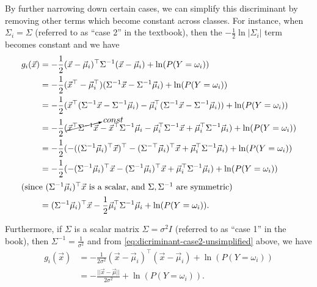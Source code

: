 \documentclass[headings=optiontoheadandtoc,listof=totoc,parskip=full]{scrartcl}
\begin{document}
By further narrowing down certain cases, we can simplify this discriminant by removing other terms which become constant across classes. For instance, when $\Sigma_i = \Sigma$ (referred to as ``case 2'' in the textbook), then the $-\frac{1}{2}\ln|\Sigma_i|$ term becomes constant and we have
\begin{align}
	g_i(\vec x) &= -\frac{1}{2}(\vec x - \vec\mu_i)^\top \Sigma^{-1} (\vec x - \vec\mu_i) + \ln(P(Y = \omega_i)) \label{eq:dicriminant-case2-unsimplified}\\
		&= -\frac{1}{2}(\vec x^\top - \vec\mu_i^\top)  (\Sigma^{-1}\vec x - \Sigma^{-1}\vec\mu_i) + \ln(P(Y = \omega_i)) \nonumber\\
		&= -\frac{1}{2}(\vec x^\top(\Sigma^{-1}\vec x - \Sigma^{-1}\vec\mu_i) - \vec\mu_i^\top(\Sigma^{-1}\vec x - \Sigma^{-1}\vec\mu_i)) + \ln(P(Y = \omega_i)) \nonumber\\
		&= -\frac{1}{2}( \cancelto{const}{\vec x^\top\Sigma^{-1}\vec x} - \vec x^\top\Sigma^{-1}\vec\mu_i - \vec\mu_i^\top\Sigma^{-1}\vec x + \vec\mu_i^\top\Sigma^{-1}\vec\mu_i) + \ln(P(Y = \omega_i)) \nonumber\\
		&= -\frac{1}{2}(-((\Sigma^{-1}\vec\mu_i)^\top\vec x)^\top - (\Sigma^{-\top}\vec\mu_i)^\top\vec x + \vec\mu_i^\top\Sigma^{-1}\vec\mu_i) + \ln(P(Y = \omega_i)) \nonumber\\
		&= -\frac{1}{2}(-(\Sigma^{-1}\vec\mu_i)^\top\vec x - (\Sigma^{-1}\vec\mu_i)^\top\vec x + \vec\mu_i^\top\Sigma^{-1}\vec\mu_i) + \ln(P(Y = \omega_i)) \nonumber\\
	\shortintertext{(since $(\Sigma^{-1}\vec\mu_i)^\top\vec x$ is a scalar, and $\Sigma, \Sigma^{-1}$ are symmetric)}
		&= (\Sigma^{-1}\vec\mu_i)^\top\vec x -\frac{1}{2}\vec\mu_i^\top\Sigma^{-1}\vec\mu_i + \ln(P(Y = \omega_i)). \label{eq:dicriminant-case2}
\end{align}

Furthermore, if $\Sigma$ is a scalar matrix $\Sigma = \sigma^2 I$ (referred to as ``case 1'' in the book), then $\Sigma^{-1} = \frac{1}{\sigma^2}$ and from \cref{eq:dicriminant-case2-unsimplified} above, we have
\begin{equation}
	\begin{split}
		g_i(\vec x) &= -\frac{1}{2\sigma^2}(\vec x - \vec\mu_i)^\top(\vec x - \vec\mu_i) + \ln(P(Y = \omega_i))\\
			&= -\frac{||\vec x - \vec\mu||}{2\sigma^2} + \ln(P(Y = \omega_i)). \label{eq:dicriminant-case1}
	\end{split}
\end{equation}
\end{document}

